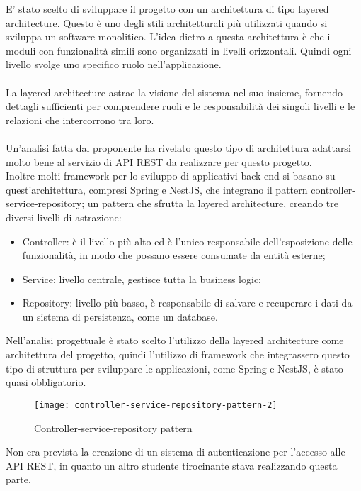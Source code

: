 E' stato scelto di sviluppare il progetto con un architettura di tipo layered architecture. Questo è uno
degli stili architetturali più utilizzati quando si sviluppa un software monolitico. L'idea dietro a 
questa architettura è che i moduli con funzionalità simili sono organizzati in livelli
orizzontali. Quindi ogni livello svolge uno specifico ruolo nell'applicazione.
\\\\
La layered architecture astrae la visione del sistema nel suo insieme, fornendo dettagli 
sufficienti per comprendere ruoli e le responsabilità dei singoli livelli e le relazioni
che intercorrono tra loro.
\\\\
Un'analisi fatta dal proponente ha rivelato questo tipo di architettura adattarsi molto bene al 
servizio di \gls{API} \gls{REST} da realizzare per questo progetto.
\\
Inoltre molti framework per lo sviluppo di applicativi \gls{back-end} si basano su quest'architettura, compresi
Spring e NestJS, che integrano il pattern controller-service-repository; un pattern
che sfrutta la layered architecture, creando tre diversi livelli di astrazione: 
\begin{itemize}
    \item Controller: è il livello più alto ed è l'unico responsabile dell'esposizione delle
        funzionalità, in modo che possano essere consumate da entità esterne;
    \item Service: livello centrale, gestisce tutta la business logic;
    \item Repository: livello più basso, è responsabile di salvare e recuperare i dati da un
        sistema di persistenza, come un database.
\end{itemize}
\clearpage
\leavevmode\newline
Nell'analisi progettuale è stato scelto l'utilizzo della layered architecture come architettura del progetto,
quindi l'utilizzo di framework che integrassero questo tipo di struttura per sviluppare le applicazioni, come 
Spring e NestJS, è stato quasi obbligatorio.
\leavevmode\newline
\begin{figure}[H]
    \centering
    \texttt{[image: controller-service-repository-pattern-2]}
    \caption{Controller-service-repository pattern}
\end{figure}
\leavevmode\newline
Non era prevista la creazione di un sistema di autenticazione per l'accesso alle \gls{API} \gls{REST}, in quanto 
un altro studente tirocinante stava realizzando questa parte.


